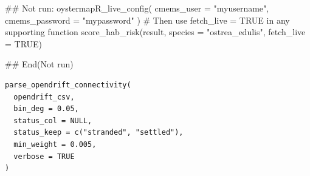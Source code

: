 \documentclass[a4paper]{book}
\begin{document}
%
\begin{Examples}
\begin{ExampleCode}
## Not run: 
oystermapR_live_config(
  cmems_user     = "myusername",
  cmems_password = "mypassword"
)
# Then use fetch_live = TRUE in any supporting function
score_hab_risk(result, species = "ostrea_edulis", fetch_live = TRUE)

## End(Not run)
\end{ExampleCode}
\end{Examples}
%
\begin{Usage}
\begin{verbatim}
parse_opendrift_connectivity(
  opendrift_csv,
  bin_deg = 0.05,
  status_col = NULL,
  status_keep = c("stranded", "settled"),
  min_weight = 0.005,
  verbose = TRUE
)
\end{verbatim}
\end{Usage}
%
\end{document}
